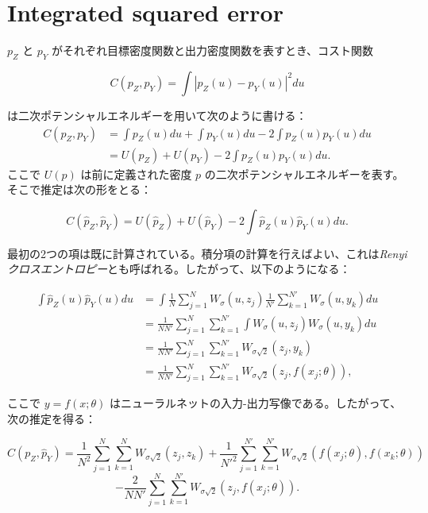 \documentclass[dvipdfmx,a4paper]{jsarticle}%
\begin{document}
\section{\textbf{Integrated squared error}}
\begin{dfn}\label{def:ise}
   $p_Z$ と $p_Y$ がそれぞれ目標密度関数と出力密度関数を表すとき、コスト関数

$$C(p_Z, p_Y) = \int |p_Z(u) - p_Y(u)|^2 du$$

は二次ポテンシャルエネルギーを用いて次のように書ける：
\begin{align*}
C(p_Z, p_Y) &= \int p_Z(u) du + \int p_Y(u) du - 2 \int p_Z(u)p_Y(u) du\\
&= U(p_Z) + U(p_Y) - 2 \int p_Z(u)p_Y(u) du.
\end{align*}
ここで $U(p)$ は前に定義された密度 $p$ の二次ポテンシャルエネルギーを表す。そこで推定は次の形をとる：

$$C(\hat{p}_Z, \hat{p}_Y) = U(\hat{p}_Z) + U(\hat{p}_Y) - 2 \int \hat{p}_Z(u)\hat{p}_Y(u) du.$$

\noindent
最初の2つの項は既に計算されている。積分項の計算を行えばよい、これは\textit{Renyiクロスエントロピー}とも呼ばれる。したがって、以下のようになる：

\begin{align*}
\int \hat{p}_Z(u)\hat{p}_Y(u) du &= \int \frac{1}{N} \sum_{j=1}^N W_\sigma(u, z_j) \frac{1}{N'} \sum_{k=1}^{N'} W_\sigma(u, y_k) du \\
&= \frac{1}{NN'} \sum_{j=1}^N \sum_{k=1}^{N'} \int W_\sigma(u, z_j)W_\sigma(u, y_k) du \\
&= \frac{1}{NN'} \sum_{j=1}^N \sum_{k=1}^{N'} W_{\sigma\sqrt{2}}(z_j, y_k) \\
&= \frac{1}{NN'} \sum_{j=1}^N \sum_{k=1}^{N'} W_{\sigma\sqrt{2}}(z_j, f(x_j; \theta)),
\end{align*}

ここで $y = f(x; \theta)$ はニューラルネットの入力-出力写像である。したがって、次の推定を得る：

$$C(p_Z, \hat{p}_Y) = \frac{1}{N^2} \sum_{j=1}^N \sum_{k=1}^N W_{\sigma\sqrt{2}}(z_j, z_k) + \frac{1}{N'^2} \sum_{j=1}^{N'} \sum_{k=1}^{N'} W_{\sigma\sqrt{2}}(f(x_j; \theta), f(x_k; \theta))$$
$$- \frac{2}{NN'} \sum_{j=1}^N \sum_{k=1}^{N'} W_{\sigma\sqrt{2}}(z_j, f(x_j; \theta)).$$
\end{dfn}
\end{document}
